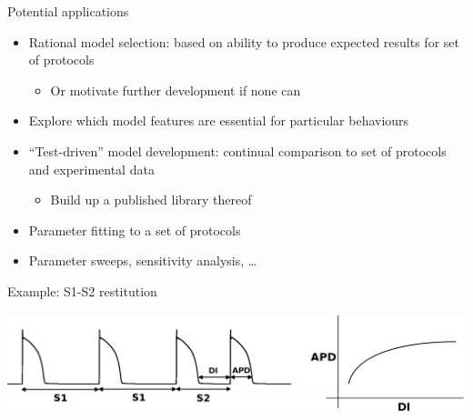 \documentclass[t,xcolor={usenames,dvipsnames}]{beamer}
\newcommand{\subitem}[1]{\begin{itemize}[<.->]\item #1 \end{itemize}}
\begin{document}
\begin{frame}{Potential applications}
\begin{itemize}
\item Rational model selection: based on ability to produce expected results for set of protocols
  \subitem{Or motivate further development if none can}
\item Explore which model features are essential for particular behaviours
\item ``Test-driven'' model development: continual comparison to set of protocols and experimental data
  \subitem{Build up a published library thereof}
\item Parameter fitting to a set of protocols
\item Parameter sweeps, sensitivity analysis, \ldots
\end{itemize}
\end{frame}

\begin{frame}{Example: S1-S2 restitution}
\begin{center}
\includegraphics[width=\textwidth]{S1S2}
\end{center}
\end{frame}
\end{document}
